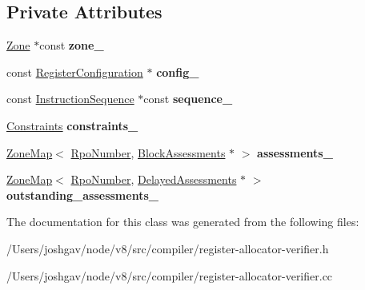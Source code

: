 \subsection*{Private Attributes}
\begin{DoxyCompactItemize}
\item 
\hyperlink{classv8_1_1internal_1_1_zone}{Zone} $\ast$const {\bfseries zone\+\_\+}\hypertarget{classv8_1_1internal_1_1compiler_1_1_register_allocator_verifier_afb7f021b8320f88c7578d12f313b5696}{}\label{classv8_1_1internal_1_1compiler_1_1_register_allocator_verifier_afb7f021b8320f88c7578d12f313b5696}

\item 
const \hyperlink{classv8_1_1internal_1_1_register_configuration}{Register\+Configuration} $\ast$ {\bfseries config\+\_\+}\hypertarget{classv8_1_1internal_1_1compiler_1_1_register_allocator_verifier_afd4d55a80bffe9e7d99fcfb900e1e67c}{}\label{classv8_1_1internal_1_1compiler_1_1_register_allocator_verifier_afd4d55a80bffe9e7d99fcfb900e1e67c}

\item 
const \hyperlink{classv8_1_1internal_1_1compiler_1_1_instruction_sequence}{Instruction\+Sequence} $\ast$const {\bfseries sequence\+\_\+}\hypertarget{classv8_1_1internal_1_1compiler_1_1_register_allocator_verifier_a87a568e5f4af4eeba760cfc2bb614b3e}{}\label{classv8_1_1internal_1_1compiler_1_1_register_allocator_verifier_a87a568e5f4af4eeba760cfc2bb614b3e}

\item 
\hyperlink{classv8_1_1internal_1_1_zone_vector}{Constraints} {\bfseries constraints\+\_\+}\hypertarget{classv8_1_1internal_1_1compiler_1_1_register_allocator_verifier_a3dfdf2dca33511bccc17194da1766ffb}{}\label{classv8_1_1internal_1_1compiler_1_1_register_allocator_verifier_a3dfdf2dca33511bccc17194da1766ffb}

\item 
\hyperlink{classv8_1_1internal_1_1_zone_map}{Zone\+Map}$<$ \hyperlink{classv8_1_1internal_1_1compiler_1_1_rpo_number}{Rpo\+Number}, \hyperlink{classv8_1_1internal_1_1compiler_1_1_block_assessments}{Block\+Assessments} $\ast$ $>$ {\bfseries assessments\+\_\+}\hypertarget{classv8_1_1internal_1_1compiler_1_1_register_allocator_verifier_a753a889288c66932a1125bc2b7b3682b}{}\label{classv8_1_1internal_1_1compiler_1_1_register_allocator_verifier_a753a889288c66932a1125bc2b7b3682b}

\item 
\hyperlink{classv8_1_1internal_1_1_zone_map}{Zone\+Map}$<$ \hyperlink{classv8_1_1internal_1_1compiler_1_1_rpo_number}{Rpo\+Number}, \hyperlink{classv8_1_1internal_1_1compiler_1_1_register_allocator_verifier_1_1_delayed_assessments}{Delayed\+Assessments} $\ast$ $>$ {\bfseries outstanding\+\_\+assessments\+\_\+}\hypertarget{classv8_1_1internal_1_1compiler_1_1_register_allocator_verifier_ae514b45465a15515c0b207dd7f5c02d9}{}\label{classv8_1_1internal_1_1compiler_1_1_register_allocator_verifier_ae514b45465a15515c0b207dd7f5c02d9}

\end{DoxyCompactItemize}


The documentation for this class was generated from the following files\+:\begin{DoxyCompactItemize}
\item 
/\+Users/joshgav/node/v8/src/compiler/register-\/allocator-\/verifier.\+h\item 
/\+Users/joshgav/node/v8/src/compiler/register-\/allocator-\/verifier.\+cc\end{DoxyCompactItemize}
